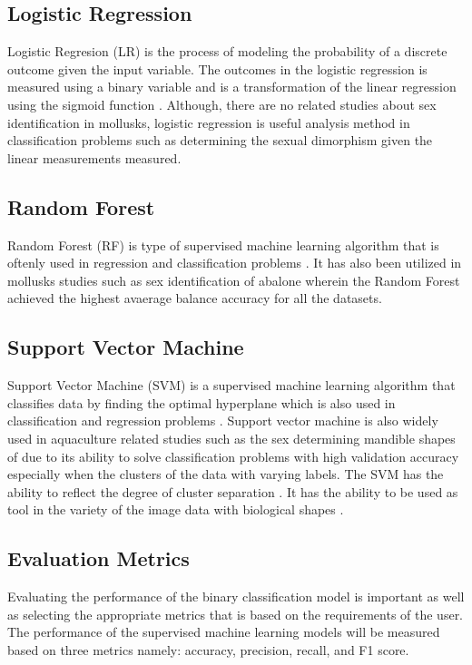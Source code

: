 \subsection{Logistic Regression}

Logistic Regresion (LR) is the process of modeling the probability of a discrete outcome given the input variable. The outcomes in the logistic regression is measured using a binary variable and is a transformation of the linear regression using the sigmoid function \cite{cui2020}. Although, there are no related studies about sex identification in mollusks, logistic regression is useful analysis method in classification problems such as determining the sexual dimorphism given the linear measurements measured. 

\subsection{Random Forest}

Random Forest (RF) is type of supervised machine learning algorithm that is oftenly used in regression and classification problems \cite{cui2020}. It has also been utilized in mollusks studies such as sex identification of abalone wherein the Random Forest achieved the highest avaerage balance accuracy for all the datasets\cite{arifin2021}.

\subsection{Support Vector Machine}

Support Vector Machine (SVM) is a supervised machine learning algorithm that classifies data by finding the optimal hyperplane which is also used in classification and regression problems \cite{cui2020}. Support vector machine is also widely used in aquaculture related studies such as the sex determining mandible shapes of due to its ability to solve classification problems with high validation accuracy especially when the clusters of the data with varying labels. The SVM has the ability to reflect the degree of cluster separation . It has the ability to be used as tool in the variety of the image data with biological shapes \cite{tsutsumi2023}.

\subsection{Evaluation Metrics}
Evaluating the performance of the binary classification model is important as well as selecting the appropriate metrics that is based on the requirements of the user. The performance of the supervised machine learning models will be measured based on three metrics namely: accuracy, precision, recall, and F1 score. 

